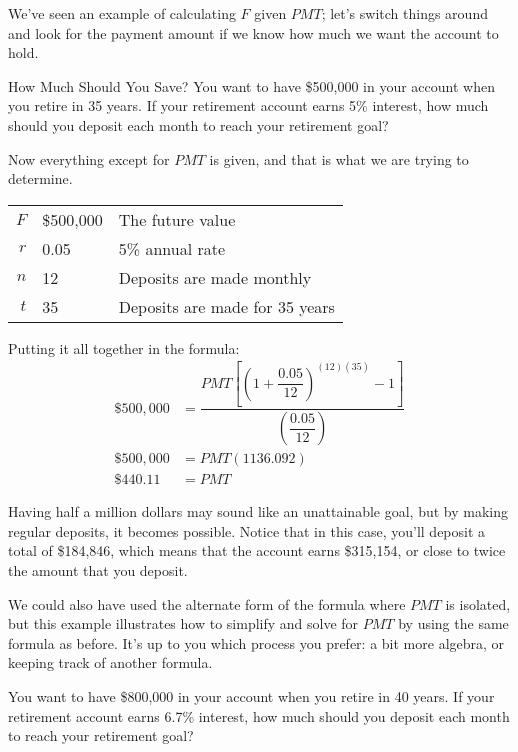 We've seen an example of calculating $F$ given $PMT$; let's switch things around and look for the payment amount if we know how much we want the account to hold.

\begin{example}[https://www.youtube.com/watch?v=TWZhZoh9TG4&list=PLfmpjsIzhztsZtnb7HnXrQ8SLoiOCIcAM&index=27]{How Much Should You Save?}
You want to have \$500,000 in your account when you retire in 35 years.  If your retirement account earns 5\% interest, how much should you deposit each month to reach your retirement goal?

\sol
Now everything except for $PMT$ is given, and that is what we are trying to determine.
\begin{center}
\begin{tabular}{r l l}
$F$ & \$500,000 & The future value\\
$r$ & 0.05 & 5\% annual rate\\
$n$ & 12 & Deposits are made monthly\\
$t$ & 35 & Deposits are made for 35 years
\end{tabular}
\end{center}

Putting it all together in the formula:
\begin{align*}
\$500,000 &= \dfrac{PMT\left[\left(1+\dfrac{0.05}{12}\right)^{(12)(35)}-1\right]}{\left(\dfrac{0.05}{12}\right)}\\
\$500,000 &= PMT(1136.092)\\
\boxed{\$440.11} &= PMT
\end{align*}

Having half a million dollars may sound like an unattainable goal, but by making regular deposits, it becomes possible.  Notice that in this case, you'll deposit a total of \$184,846, which means that the account earns \$315,154, or close to twice the amount that you deposit.
\end{example}

We could also have used the alternate form of the formula where $PMT$ is isolated, but this example illustrates how to simplify and solve for $PMT$ by using the same formula as before.  It's up to you which process you prefer: a bit more algebra, or keeping track of another formula.

\begin{try}
You want to have \$800,000 in your account when you retire in 40 years.  If your retirement account earns 6.7\% interest, how much should you deposit each month to reach your retirement goal?
\end{try}


